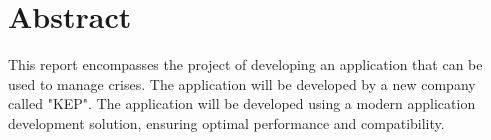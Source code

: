 \section{Abstract}
This report encompasses the project of developing an application that can be used to manage crises. The application will be developed by a new company called "KEP". 
The application will be developed using a modern application development solution, ensuring optimal performance and compatibility.

\newpage